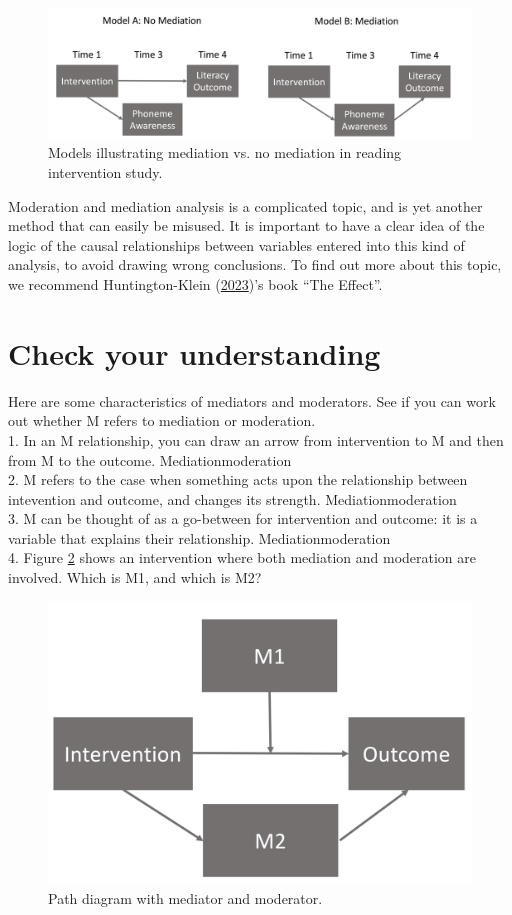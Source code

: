 \documentclass{krantz}
\begin{document}
\begin{figure}
\includegraphics[width=0.85\linewidth]{images_bw/mediation_diagram} \caption{Models illustrating mediation vs. no mediation in reading intervention study.}\label{fig:medfig}
\end{figure}

Moderation and mediation analysis is a complicated topic, and is yet another method that can easily be misused. It is important to have a clear idea of the logic of the causal relationships between variables entered into this kind of analysis, to avoid drawing wrong conclusions. To find out more about this topic, we recommend Huntington-Klein (\protect\hyperlink{ref-huntington-klein}{2023})'s book ``The Effect''.

\hypertarget{check-your-understanding-15}{%
\section{Check your understanding}\label{check-your-understanding-15}}

Here are some characteristics of mediators and moderators. See if you can work out whether M refers to mediation or moderation.\\
1. In an M relationship, you can draw an arrow from intervention to M and then from M to the outcome. Mediation\textbar moderation\\
2. M refers to the case when something acts upon the relationship between intevention and outcome, and changes its strength. Mediation\textbar moderation\\
3. M can be thought of as a go-between for intervention and outcome: it is a variable that explains their relationship. Mediation\textbar moderation\\
4. Figure \ref{fig:medmodfig} shows an intervention where both mediation and moderation are involved. Which is M1, and which is M2?

\begin{figure}
\includegraphics[width=0.5\linewidth]{images_bw/medmod} \caption{Path diagram with mediator and moderator.}\label{fig:medmodfig}
\end{figure}
\end{document}
